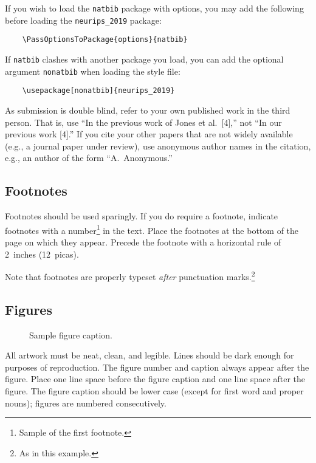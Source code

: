 \documentclass{article}
\begin{document}
	If you wish to load the \verb+natbib+ package with options, you may add the
	following before loading the \verb+neurips_2019+ package:
	\begin{verbatim}
	\PassOptionsToPackage{options}{natbib}
	\end{verbatim}
	
	If \verb+natbib+ clashes with another package you load, you can add the optional
	argument \verb+nonatbib+ when loading the style file:
	\begin{verbatim}
	\usepackage[nonatbib]{neurips_2019}
	\end{verbatim}
	
	As submission is double blind, refer to your own published work in the third
	person. That is, use ``In the previous work of Jones et al.\ [4],'' not ``In our
	previous work [4].'' If you cite your other papers that are not widely available
	(e.g., a journal paper under review), use anonymous author names in the
	citation, e.g., an author of the form ``A.\ Anonymous.''
	
	\subsection{Footnotes}
	
	Footnotes should be used sparingly.  If you do require a footnote, indicate
	footnotes with a number\footnote{Sample of the first footnote.} in the
	text. Place the footnotes at the bottom of the page on which they appear.
	Precede the footnote with a horizontal rule of 2~inches (12~picas).
	
	Note that footnotes are properly typeset \emph{after} punctuation
	marks.\footnote{As in this example.}
	
	\subsection{Figures}
	
	\begin{figure}
		\centering
		\fbox{\rule[-.5cm]{0cm}{4cm} \rule[-.5cm]{4cm}{0cm}}
		\caption{Sample figure caption.}
	\end{figure}
	
	All artwork must be neat, clean, and legible. Lines should be dark enough for
	purposes of reproduction. The figure number and caption always appear after the
	figure. Place one line space before the figure caption and one line space after
	the figure. The figure caption should be lower case (except for first word and
	proper nouns); figures are numbered consecutively.
	
\end{document}
